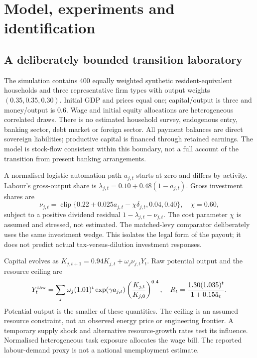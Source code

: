 \section{Model, experiments and identification}
\subsection{A deliberately bounded transition laboratory}
The simulation contains 400 equally weighted synthetic resident-equivalent households and three representative firm types with output weights $(0.35,0.35,0.30)$. Initial GDP and prices equal one; capital/output is three and money/output is 0.6. Wage and initial equity allocations are heterogeneous correlated draws. There is no estimated household survey, endogenous entry, banking sector, debt market or foreign sector. All payment balances are direct sovereign liabilities; productive capital is financed through retained earnings. The model is stock-flow consistent within this boundary, not a full account of the transition from present banking arrangements.

A normalised logistic automation path $a_{j,t}$ starts at zero and differs by activity. Labour's gross-output share is $\lambda_{j,t}=0.10+0.48(1-a_{j,t})$. Gross investment shares are
\begin{equation}
\nu_{j,t}=\operatorname{clip}\{0.22+0.025a_{j,t}-\chi\delta_{j,t},0.04,0.40\},\quad\chi=0.60,
\end{equation}
subject to a positive dividend residual $1-\lambda_{j,t}-\nu_{j,t}$. The cost parameter $\chi$ is assumed and stressed, not estimated. The matched-levy comparator deliberately uses the same investment wedge. This isolates the legal form of the payout; it does not predict actual tax-versus-dilution investment responses.

Capital evolves as $K_{j,t+1}=0.94K_{j,t}+\omega_j\nu_{j,t}Y_t$. Raw potential output and the resource ceiling are
\begin{equation}
Y_t^{\rm raw}=\sum_j\omega_j(1.01)^t\exp(\gamma a_{j,t})\left(\frac{K_{j,t}}{K_{j,0}}\right)^{0.4},\quad R_t=\frac{1.30(1.035)^t}{1+0.15\bar a_t}.
\end{equation}
Potential output is the smaller of these quantities. The ceiling is an assumed resource constraint, not an observed energy price or engineering frontier. A temporary supply shock and alternative resource-growth rates test its influence. Normalised heterogeneous task exposure allocates the wage bill. The reported labour-demand proxy is not a national unemployment estimate.

